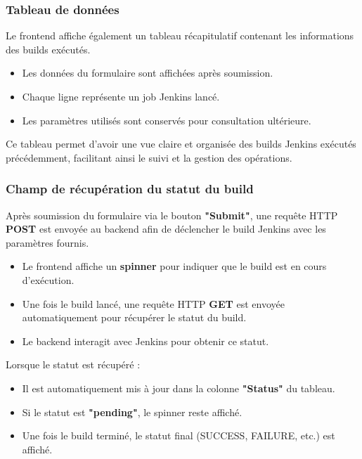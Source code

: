 \subsubsection*{Tableau de données}

Le frontend affiche également un tableau récapitulatif contenant les informations des builds exécutés.

\begin{itemize}
    \item Les données du formulaire sont affichées après soumission.
    \item Chaque ligne représente un job Jenkins lancé.
    \item Les paramètres utilisés sont conservés pour consultation ultérieure.
\end{itemize}

Ce tableau permet d’avoir une vue claire et organisée des builds Jenkins exécutés précédemment, facilitant ainsi le suivi et la gestion des opérations.
\subsubsection*{Champ de récupération du statut du build}

Après soumission du formulaire via le bouton \textbf{"Submit"}, une requête HTTP \textbf{POST} est envoyée au backend afin de déclencher le build Jenkins avec les paramètres fournis.

\begin{itemize}
    \item Le frontend affiche un \textbf{spinner} pour indiquer que le build est en cours d’exécution.
    \item Une fois le build lancé, une requête HTTP \textbf{GET} est envoyée automatiquement pour récupérer le statut du build.
    \item Le backend interagit avec Jenkins pour obtenir ce statut.
\end{itemize}

Lorsque le statut est récupéré :
\begin{itemize}
    \item Il est automatiquement mis à jour dans la colonne \textbf{"Status"} du tableau.
    \item Si le statut est \textbf{"pending"}, le spinner reste affiché.
    \item Une fois le build terminé, le statut final (SUCCESS, FAILURE, etc.) est affiché.
\end{itemize}

